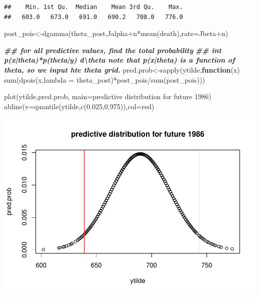 \documentclass[
]{book}
\newenvironment{Shaded}{\begin{snugshade}}{\end{snugshade}}
\newcommand{\AttributeTok}[1]{\textcolor[rgb]{0.77,0.63,0.00}{#1}}
\newcommand{\ControlFlowTok}[1]{\textcolor[rgb]{0.13,0.29,0.53}{\textbf{#1}}}
\newcommand{\DocumentationTok}[1]{\textcolor[rgb]{0.56,0.35,0.01}{\textbf{\textit{#1}}}}
\newcommand{\FloatTok}[1]{\textcolor[rgb]{0.00,0.00,0.81}{#1}}
\newcommand{\FunctionTok}[1]{\textcolor[rgb]{0.00,0.00,0.00}{#1}}
\newcommand{\NormalTok}[1]{#1}
\newcommand{\OtherTok}[1]{\textcolor[rgb]{0.56,0.35,0.01}{#1}}
\newcommand{\SpecialCharTok}[1]{\textcolor[rgb]{0.00,0.00,0.00}{#1}}
\newcommand{\StringTok}[1]{\textcolor[rgb]{0.31,0.60,0.02}{#1}}
\theoremstyle{definition}
\theoremstyle{definition}
\theoremstyle{definition}
\theoremstyle{definition}
\theoremstyle{remark}
\begin{document}
\begin{verbatim}
##    Min. 1st Qu.  Median    Mean 3rd Qu.    Max. 
##   603.0   673.0   691.0   690.2   708.0   776.0
\end{verbatim}

\begin{Shaded}
\begin{Highlighting}[]
\NormalTok{   post\_pois}\OtherTok{\textless{}{-}}\FunctionTok{dgamma}\NormalTok{(theta\_post,Jalpha}\SpecialCharTok{+}\NormalTok{n}\SpecialCharTok{*}\FunctionTok{mean}\NormalTok{(death),}\AttributeTok{rate=}\NormalTok{Jbeta}\SpecialCharTok{+}\NormalTok{n)}

\DocumentationTok{\#\# for all predictive values,  find the total probability  }
   \DocumentationTok{\#\# int p(x|theta)*p(theta|y) d\textbackslash{}theta  note that p(x|theta) is a function of theta, so we input hte theta grid.}
\NormalTok{ pred.prob}\OtherTok{\textless{}{-}}\FunctionTok{sapply}\NormalTok{(ytilde,}\ControlFlowTok{function}\NormalTok{(x) }\FunctionTok{sum}\NormalTok{(}\FunctionTok{dpois}\NormalTok{(x,}\AttributeTok{lambda =}\NormalTok{ theta\_post)}\SpecialCharTok{*}\NormalTok{post\_pois}\SpecialCharTok{/}\FunctionTok{sum}\NormalTok{(post\_pois)))  }
  
 \FunctionTok{plot}\NormalTok{(ytilde,pred.prob, }\AttributeTok{main=}\StringTok{\textquotesingle{}predictive distribution for future 1986\textquotesingle{}}\NormalTok{)}
 \FunctionTok{abline}\NormalTok{(}\AttributeTok{v=}\FunctionTok{quantile}\NormalTok{(ytilde,}\FunctionTok{c}\NormalTok{(}\FloatTok{0.025}\NormalTok{,}\FloatTok{0.975}\NormalTok{)),}\AttributeTok{col=}\StringTok{\textquotesingle{}red\textquotesingle{}}\NormalTok{)}
\end{Highlighting}
\end{Shaded}

\includegraphics{_main_files/figure-latex/unnamed-chunk-26-2.pdf}
\end{document}
